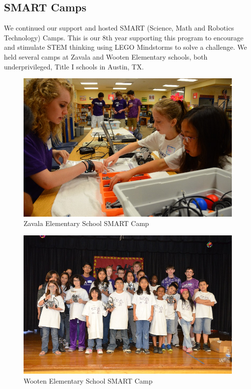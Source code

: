 \subsection{SMART Camps}
We continued our support and hosted SMART (Science, Math and Robotics Technology) Camps.  This is our 8th year supporting this program to encourage and stimulate STEM thinking using LEGO Mindstorms to solve a challenge.  We held several camps at Zavala and Wooten Elementary schools, both underprivileged, Title I schools in Austin, TX.\\
\begin{figure}[H]
	\centering
	\includegraphics[width=0.6\linewidth]{smart}
	\caption[]{Zavala Elementary School SMART Camp}
	\label{fig:smart}
\end{figure}
\begin{figure}[H]
	\centering
	\includegraphics[width=0.6\linewidth]{smart1}
	\caption[]{Wooten Elementary School SMART Camp}
	\label{fig:smart1}
\end{figure}

